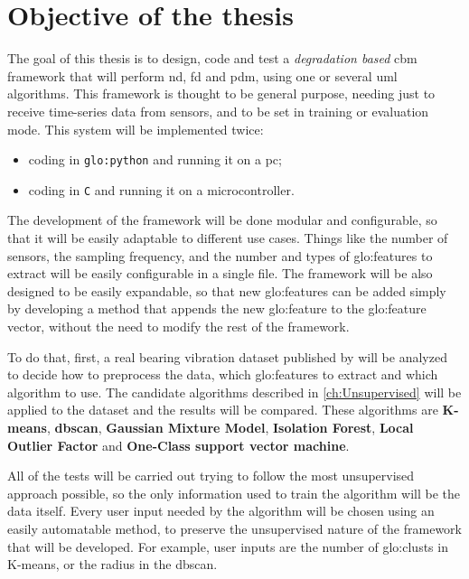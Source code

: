 \section{Objective of the thesis}
\label{sec:objectives}

The goal of this thesis is to design, code and test a \emph{degradation based} \gls{cbm} framework that will perform \gls{nd}, \gls{fd} and \gls{pdm}, using one or several \gls{uml} algorithms. This framework is thought to be general purpose, needing just to receive time-series data from sensors, and to be set in training or evaluation mode.
This system will be implemented twice:
\begin{itemize}
    \item  coding in \texttt{\gls{glo:python}} and running it on a \gls{pc};
    \item   coding in \texttt{C} and running it on a microcontroller.
\end{itemize}

The development of the framework will be done modular and configurable, so that it will be easily adaptable to different use cases. Things like the number of sensors, the sampling frequency, and the number and types of \gls{glo:feature}s to extract will be easily configurable in a single file. The framework will be also designed to be easily expandable, so that new \gls{glo:feature}s can be added simply by developing a method that appends the new \gls{glo:feature} to the \gls{glo:feature} vector, without the need to modify the rest of the framework.

To do that, first, a real bearing vibration dataset published by \cite{IMSpaper} will be analyzed to decide how to preprocess the data, which \gls{glo:feature}s to extract and which algorithm to use. 
The candidate algorithms described in \autoref{ch:Unsupervised} will be applied to the dataset and the results will be compared. These algorithms are \textbf{K-means}, \textbf{\gls{dbscan}}, \textbf{Gaussian Mixture Model}, \textbf{Isolation Forest}, \textbf{Local Outlier Factor} and \textbf{One-Class support vector machine}. 

All of the tests will be carried out trying to follow the most unsupervised approach possible, so the only information used to train the algorithm will be the data itself. Every user input needed by the algorithm will be chosen using an easily automatable method, to preserve the unsupervised nature of the framework that will be developed. For example, user inputs are the number of \gls{glo:clust}s in K-means, or the radius in the \gls{dbscan}.

